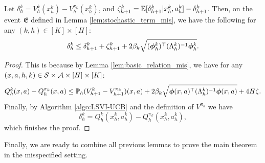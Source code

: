 \begin{lemma}\label{lem:recursive_mis}
Let $\delta^k_h = V^k_h(x^{k}_{h}) - V^{\pi_k}_h(x^{k}_{h})$, and $\zeta^k_{h+1} = 
\mathbb{E}[\delta^k_{h+1}|x^{k}_h, a^{k}_h] - \delta_{h+1}^k$. Then, on the event $\mathfrak{E}$ defined in Lemma \ref{lem:stochastic_term_mis}, we have the following for any $(k, h)\in [K]\times [H]$:
\begin{equation*}
\delta^k_h \le \delta^k_{h+1} + \zeta^k_{h+1} + 2\beta_k\sqrt{(\bm{\phi}^{k}_h)^{\top} (\Lambda^k_h)^{-1}  \bm{\phi}^{k}_h}.
\end{equation*}
\end{lemma}

\begin{proof} This is because by Lemma \ref{lem:basic_relation_mis}, we have for any $(x, a, h, k) \in \mathcal{S} \times \mathcal{A} \times [H] \times [K]$:
\begin{equation*}
Q^k_h(x, a) - Q^{\pi_k}_h(x, a)
\le \mathbb{P}_h (V^{k}_{h+1} - V^{\pi_k}_{h+1})(x, a)
+ 2\beta_k \sqrt{\bm{\phi}(x, a)^{\top} (\Lambda^k_h)^{-1}  \bm{\phi}(x, a)} + 4H\zeta. 
\end{equation*}
Finally, by Algorithm \ref{algo:LSVI-UCB} and the definition of $V^{\pi_k}$ we have
$$\delta^k_h = Q^k_h(x^{k}_h, a^{k}_h) - Q^{\pi_k}_h(x^{k}_h, a^{k}_h), $$
which finishes the proof.
\end{proof}

Finally, we are ready to combine all previous lemmas to prove the main theorem in the misspecified setting.

\THMmainmis*

